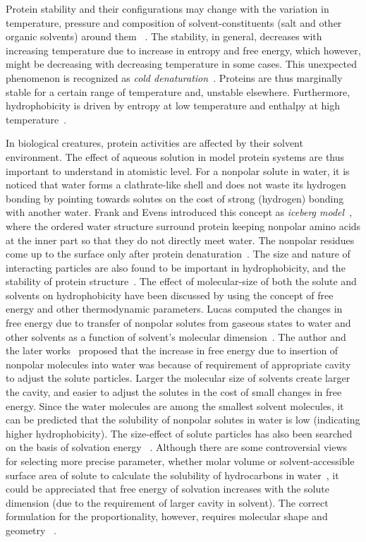Protein stability and their configurations may change with the variation in temperature, pressure and composition of solvent-constituents (salt and other organic solvents) around them ~\citep{Djikaev2016}. The stability, in general, decreases with increasing temperature due to increase in entropy and free energy, which however, might be decreasing with decreasing temperature in some cases. This unexpected phenomenon is recognized as {\it cold denaturation}~\citep{Privalov1988, Southall2002}. Proteins are thus marginally stable for a certain range of temperature and, unstable elsewhere. Furthermore, hydrophobicity is driven by entropy at low temperature and enthalpy at high temperature~\citep{Southall2002}. 

In biological creatures, protein activities are affected by their solvent environment. The effect of 
aqueous solution in model protein systems are thus important to understand in atomistic level. For a nonpolar solute in water, it is noticed that water forms a clathrate-like shell and does not waste its hydrogen bonding by pointing towards solutes on the cost of strong (hydrogen) 
bonding with another water. Frank and Evens introduced this concept as {\it iceberg model}~\citep{Frank1945}, where the ordered water structure surround protein keeping nonpolar amino acids at the inner part so that they do not directly meet water. The nonpolar residues come up to the surface only after protein denaturation~\citep{Dill1990}. The size and nature of interacting particles are also found to be important in hydrophobicity, and the stability of protein structure~\citep{Djikaev2016}. The effect of molecular-size of both the solute and solvents on hydrophobicity have been discussed by using the concept of free energy and other thermodynamic parameters. Lucas computed the changes in free energy due to transfer of nonpolar solutes from gaseous states to water and other solvents as a function of solvent's molecular dimension~\citep{Lucas1976}. The author and the later works~\citep{Lee1985} proposed that the increase in free energy due to insertion of nonpolar molecules into water was because of 
requirement of appropriate cavity to adjust the solute particles. Larger the molecular size of solvents create larger the cavity, and easier to adjust the solutes in the cost of small changes in free energy. Since the water molecules are among the smallest solvent molecules, it can be predicted that the solubility of nonpolar solutes in water is low (indicating higher hydrophobicity). The size-effect of solute particles has also been searched on the basis of solvation energy ~\citep{Chan1991, Mcauliffe1963}. Although there are some controversial views for selecting more precise  parameter, whether molar volume or solvent-accessible surface area of solute to calculate the solubility of hydrocarbons in water~\citep{Parker1963, Frank1966, Reynolds1974}, it could be appreciated that free energy of solvation increases with the solute dimension (due to the requirement of larger cavity in solvent). The correct formulation for the proportionality, however,
requires molecular shape and geometry ~\citep{Lazaridis2000}.

